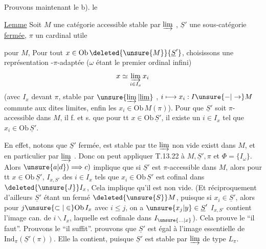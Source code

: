 Prouvons maintenant le b).  le

\uline{Lemme} Soit $M$ une catégorie accessible stable par
$\varinjlim$ 
,
$\underline S'$ une sous-catégorie \uline{fermée}, $\pi$ un cardinal utile

pour $M$, 
Pour  tout
$x\in\mathrm{Ob}\,\deleted{\unsure{M}}{\underline S'}$, choisissons
une représentation \deleted{$\unsure{\alpha}$}-$\pi$-adaptée
($\omega$ étant le premier ordinal infini)
\[
 x\simeq\varinjlim_{i\in I_x}x_i
\]
(avec $I_x$  devant $\pi$, stable par
$\unsure{\varinjlim|\underline{\lim}}$ 
, $i\longmapsto x_i:I\unsure{-|\to}M$
commute aux dites limites, enfin les $x_i\in\mathrm{Ob}\,M(\pi)$).
Pour que $\underline S'$ soit $\pi$-accessible dans $M$, il f. et s.
que pour tt $x\in\mathrm{Ob}\,\underline S'$, il existe un
$i\in I_x$ tel que $x_i\in\mathrm{Ob}\,\underline S'$.

En effet,  notons que $\underline S'$
 fermée, est stable  par tte
$\varinjlim$ non vide existt dans $M$, et en particulier par
$\varinjlim$  .
Donc on peut appliquer T.13.22  à
$M,\underline S',\pi$ et $\Phi=\{I_{\omega}\}$.
Alors $\unsure{a|d})\Longrightarrow c)$ implique que si
$\underline S'$ est $\pi$-accessible dans $M$, alors pour tt
$x\in\mathrm{Ob}\,\underline S'$,  $I_{x,S'}$ des $i\in I_x$
tels que $x_i\in\mathrm{Ob}\,\underline S'$ est cofinal dans
$\deleted{\unsure{J}}I_x$,  Cela implique qu'il
est non vide. (Et réciproquement d'ailleurs $\underline S'$ étant un
fermé  $\deleted{\unsure{S}}M$, puisque si $x_i\in\underline S'$,
alors pour $j\unsure{\subset|\in}\mathrm{Ob}\,I_x$ avec $i\leq j$,
on a $\unsure{x_j|y}\in\underline S'$ 
 $I_{x,S'}$ contient l'image can. de $i\backslash I_x$,
laquelle est cofinale dans $I_{\unsure{\ldotp\ldotp\ldotp|x}}$).
Cela prouve le ``il faut''.
Prouvons le ``il suffit''. 
prouvons que $\underline S'$ est égal à l'image essentielle de
$\mathrm{Ind}_{\pi}(\underline S'(\pi))$. Elle la contient,
puisque $\underline S'$ est stable par $\varinjlim$ de type $L_{\pi}$.

